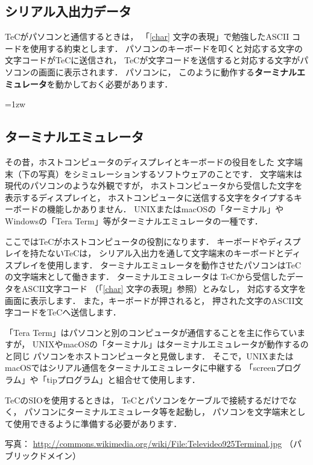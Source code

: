 \subsection{シリアル入出力データ}
TeCがパソコンと通信するときは，
「\ref{char} 文字の表現」で勉強したASCII コードを使用する約束とします．
パソコンのキーボードを叩くと対応する文字の文字コードがTeCに送信され，
TeCが文字コードを送信すると対応する文字がパソコンの画面に表示されます．
パソコンに，
このように動作する{\bf ターミナルエミュレータ}を動かしておく必要があります．

\newpage
\begin{framed}{\parindent=1zw
\subsection*{ターミナルエミュレータ}\label{terminal}{\small
その昔，ホストコンピュータのディスプレイとキーボードの役目をした
文字端末（下の写真）をシミュレーションするソフトウェアのことです．
文字端末は現代のパソコンのような外観ですが，
ホストコンピュータから受信した文字を表示するディスプレイと，
ホストコンピュータに送信する文字をタイプするキーボードの機能しかありません．
UNIXまたはmacOSの「ターミナル」や
Windowsの「Tera Term」等がターミナルエミュレータの一種です．

ここではTeCがホストコンピュータの役割になります．
キーボードやディスプレイを持たないTeCは，
シリアル入出力を通して文字端末のキーボードとディスプレイを使用します．
ターミナルエミュレータを動作させたパソコンはTeCの文字端末として働きます．
ターミナルエミュレータは
TeCから受信したデータをASCII文字コード
（「\ref{char} 文字の表現」参照）とみなし，
対応する文字を画面に表示します．
また，キーボードが押されると，
押された文字のASCII文字コードをTeCへ送信します．

「Tera Term」はパソコンと別のコンピュータが通信することを主に作らていますが，
UNIXやmacOSの「ターミナル」はターミナルエミュレータが動作するのと同じ
パソコンをホストコンピュータと見做します．
そこで，UNIXまたはmacOSではシリアル通信をターミナルエミュレータに中継する
「screenプログラム」や「tipプログラム」と組合せて使用します．

TeCのSIOを使用するときは，
TeCとパソコンをケーブルで接続するだけでなく，
パソコンにターミナルエミュレータ等を起動し，
パソコンを文字端末として使用できるように準備する必要があります．
\begin{center}
\end{center}
写真：
\url{http://commons.wikimedia.org/wiki/File:Televideo925Terminal.jpg}
（パブリックドメイン）
}}\end{framed}

